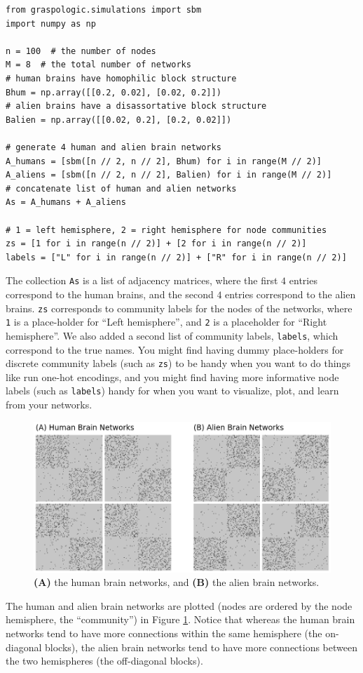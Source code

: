 \begin{lstlisting}[style=python]
from graspologic.simulations import sbm
import numpy as np

n = 100  # the number of nodes
M = 8  # the total number of networks
# human brains have homophilic block structure
Bhum = np.array([[0.2, 0.02], [0.02, 0.2]])
# alien brains have a disassortative block structure
Balien = np.array([[0.02, 0.2], [0.2, 0.02]])

# generate 4 human and alien brain networks
A_humans = [sbm([n // 2, n // 2], Bhum) for i in range(M // 2)]
A_aliens = [sbm([n // 2, n // 2], Balien) for i in range(M // 2)]
# concatenate list of human and alien networks
As = A_humans + A_aliens

# 1 = left hemisphere, 2 = right hemisphere for node communities
zs = [1 for i in range(n // 2)] + [2 for i in range(n // 2)]
labels = ["L" for i in range(n // 2)] + ["R" for i in range(n // 2)]
\end{lstlisting}

The collection \texttt{As} is a list of adjacency matrices, where the first $4$ entries correspond to the human brains, and the second $4$ entries correspond to the alien brains. \texttt{zs} corresponds to community labels for the nodes of the networks, where \texttt{1} is a place-holder for ``Left hemisphere'', and \texttt{2} is a placeholder for ``Right hemisphere''. We also added a second list of community labels, \texttt{labels}, which correspond to the true names. You might find having dummy place-holders for discrete community labels (such as \texttt{zs}) to be handy when you want to do things like run one-hot encodings, and you might find having more informative node labels (such as \texttt{labels}) handy for when you want to visualize, plot, and learn from your networks.

\begin{figure}[h]
    \centering
    \includegraphics[width=\linewidth]{representations/ch6/Images/multi_ex.png}
    \caption[Alien/Human brain network example]{\textbf{(A)} the human brain networks, and \textbf{(B)} the alien brain networks.}
    \label{fig:ch6:multinet:ex}
\end{figure}
The human and alien brain networks are plotted (nodes are ordered by the node hemisphere, the ``community'') in Figure \ref{fig:ch6:multinet:ex}. Notice that whereas the human brain networks tend to have more connections within the same hemisphere (the on-diagonal blocks), the alien brain networks tend to have more connections between the two hemispheres (the off-diagonal blocks). 

